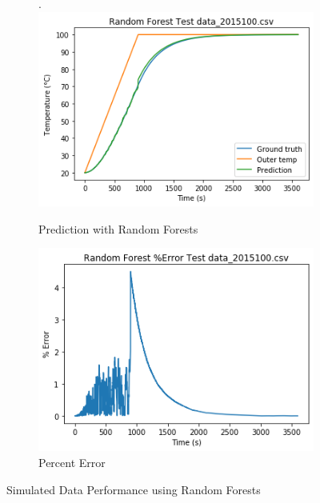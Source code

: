 \begin{figure}[ht]
    \begin{subfigure}{.5\linewidth}.
        \centering
    	\includegraphics[width=\linewidth]{other/RF_prediction_simulated.png}
        \caption{Prediction with Random Forests}
        \label{RF_sim}
    \end{subfigure}
    \begin{subfigure}{.5\linewidth}
    	\centering
    	\includegraphics[width=\linewidth]{other/RF_error_simulated.png}
        \caption{Percent Error}
        \label{RF_sim_err}
    \end{subfigure}
    \caption{Simulated Data Performance using Random Forests}
\end{figure}

